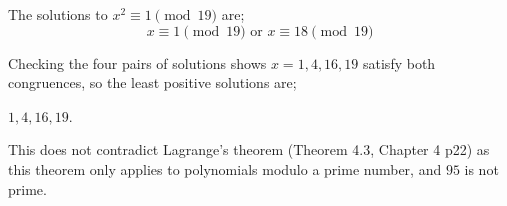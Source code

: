\documentclass{tufte-handout}
\begin{document}
\begin{question}
The solutions to \( x^2 \equiv 1 \pmod{19} \) are;
\[ x \equiv 1 \pmod{19} \text{ or } x \equiv 18 \pmod{19} \]

Checking the four pairs of solutions shows $x=1, 4, 16, 19$ satisfy both congruences, so the least positive solutions are;

$\boxed{1, 4, 16, 19}$.

\vspace{5cm}

\qpart

This does not contradict Lagrange's theorem (\textup{Theorem 4.3, Chapter 4 p22}) as this theorem only applies to
polynomials modulo a prime number, and \( 95 \) is not prime.

\end{question}
\end{document}
